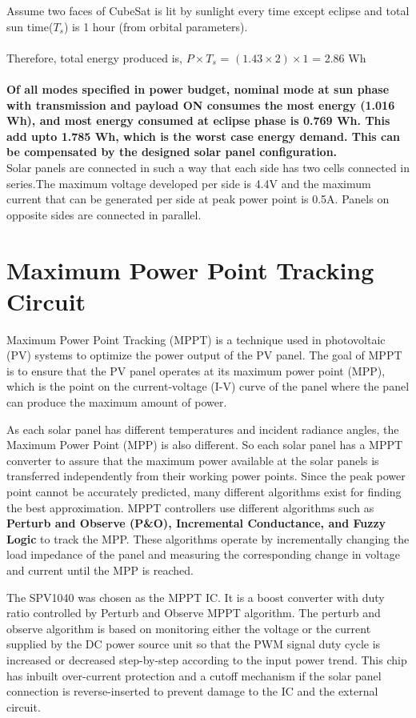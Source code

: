 Assume two faces of CubeSat is lit by sunlight every time except eclipse and total sun time($T_{s}$) is 1 hour (from orbital parameters).
\\ \\ Therefore, total energy produced is, $P \times  T_{s}$ = $(1.43 \times 2) \times 1$ = 2.86 Wh
\\ \\ \textbf{Of all modes specified in power budget, nominal mode at sun phase with transmission and payload ON consumes the most energy (1.016 Wh), and most energy consumed at eclipse phase is 0.769 Wh. This add upto 1.785 Wh, which is the worst case energy demand. This can be compensated by the designed solar panel configuration.}
\\
Solar panels are connected in such a way that each side has two cells connected in series.The maximum voltage developed per side is 4.4V and the maximum current that can be generated per side at peak power point is 0.5A.
Panels on opposite sides are connected in parallel.


\section[MPPT Circuit]{Maximum Power Point Tracking Circuit}

Maximum Power Point Tracking (MPPT) is a technique used in photovoltaic (PV) systems to optimize the power output of the PV panel. The goal of MPPT is to ensure that the PV panel operates at its maximum power point (MPP), which is the point on the current-voltage (I-V) curve of the panel where the panel can produce the maximum amount of power.

As each solar panel has different temperatures and incident radiance angles, the
Maximum Power Point (MPP) is also different. So each solar panel has a MPPT
converter to assure that the maximum power available at the solar panels is
transferred independently from their working power points. Since the peak power
point cannot be accurately predicted, many different algorithms exist for finding
the best approximation. MPPT controllers use different algorithms such as {\bf Perturb and Observe (P&O), Incremental Conductance, and Fuzzy Logic} to track the MPP. These algorithms operate by incrementally changing the load impedance of the panel and measuring the corresponding change in voltage and current until the MPP is reached.

The SPV1040 was chosen as the MPPT IC. It is a boost converter with duty ratio controlled by Perturb and Observe MPPT algorithm. The perturb and observe algorithm is based on monitoring either the voltage or the current supplied by the DC power source unit so that the PWM signal duty cycle is increased or decreased step-by-step according to the input power trend. This chip has inbuilt over-current protection and a cutoff mechanism if the solar panel connection is reverse-inserted to prevent damage to the IC and the external circuit.

